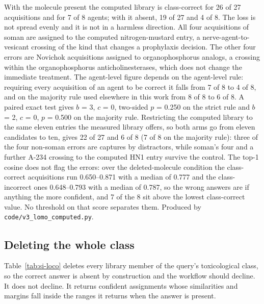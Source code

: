 \documentclass[11pt]{article}
\begin{document}
\begin{table}[htbp]
\begin{flushleft}\footnotesize With the molecule present the computed library is class-correct for 26 of 27 acquisitions and for 7 of 8 agents; with it absent, 19 of 27 and 4 of 8. The loss is not spread evenly and it is not in a harmless direction. All four acquisitions of soman are assigned to the computed nitrogen-mustard entry, a nerve-agent-to-vesicant crossing of the kind that changes a prophylaxis decision. The other four errors are Novichok acquisitions assigned to organophosphorus analogs, a crossing within the organophosphorus anticholinesterases, which does not change the immediate treatment. The agent-level figure depends on the agent-level rule: requiring every acquisition of an agent to be correct it falls from 7 of 8 to 4 of 8, and on the majority rule used elsewhere in this work from 8 of 8 to 6 of 8. A paired exact test gives $b$ = 3, $c$ = 0, two-sided $p$ = 0.250 on the strict rule and $b$ = 2, $c$ = 0, $p$ = 0.500 on the majority rule. Restricting the computed library to the same eleven entries the measured library offers, so both arms go from eleven candidates to ten, gives 22 of 27 and 6 of 8 (7 of 8 on the majority rule): three of the four non-soman errors are captures by distractors, while soman's four and a further A-234 crossing to the computed HN1 entry survive the control. The top-1 cosine does not flag the errors: over the deleted-molecule condition the class-correct acquisitions run 0.650--0.871 with a median of 0.777 and the class-incorrect ones 0.648--0.793 with a median of 0.787, so the wrong answers are if anything the more confident, and 7 of the 8 sit above the lowest class-correct value. No threshold on that score separates them. Produced by \texttt{code/v3\_lomo\_computed.py}.\end{flushleft}
\end{table}
\clearpage

\subsection{Deleting the whole class}

Table~\ref{tab:si-loco} deletes every library member of the query's toxicological class,
so the correct answer is absent by construction and the workflow should decline. It does
not decline. It returns confident assignments whose similarities and margins fall inside
the ranges it returns when the answer is present.
\end{document}
